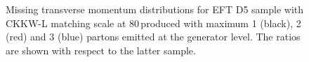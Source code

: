\begin{figure}[h!]
	\centering  
	\hfill
	\hfill
	\caption{Missing transverse momentum distributions for EFT D5 sample with CKKW-L matching scale at 80\,\gev produced with maximum 1 (black), 2 (red) and 3 (blue) partons emitted at the generator level. The ratios are shown with respect to the latter sample.}
	\label{fig:RatioKine_D5}
\end{figure}


